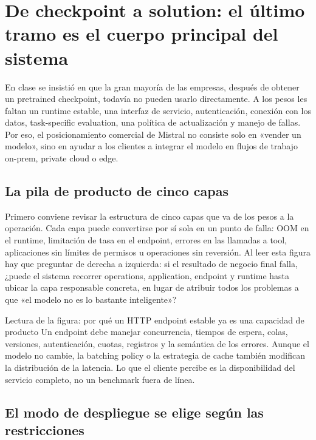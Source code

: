 \section{De checkpoint a solution: el último tramo es el cuerpo principal del sistema}

En clase se insistió en que la gran mayoría de las empresas, después de obtener un pretrained checkpoint, todavía no pueden usarlo directamente. A los pesos les faltan un runtime estable, una interfaz de servicio, autenticación, conexión con los datos, task-specific evaluation, una política de actualización y manejo de fallas. Por eso, el posicionamiento comercial de Mistral no consiste solo en «vender un modelo», sino en ayudar a los clientes a integrar el modelo en flujos de trabajo on-prem, private cloud o edge.

\subsection{La pila de producto de cinco capas}

Primero conviene revisar la estructura de cinco capas que va de los pesos a la operación. Cada capa puede convertirse por sí sola en un punto de falla: OOM en el runtime, limitación de tasa en el endpoint, errores en las llamadas a tool, aplicaciones sin límites de permisos u operaciones sin reversión. Al leer esta figura hay que preguntar de derecha a izquierda: si el resultado de negocio final falla, ¿puede el sistema recorrer operations, application, endpoint y runtime hasta ubicar la capa responsable concreta, en lugar de atribuir todos los problemas a que «el modelo no es lo bastante inteligente»?


\begin{knowledgebox}{Lectura de la figura: por qué un HTTP endpoint estable ya es una capacidad de producto}
Un endpoint debe manejar concurrencia, tiempos de espera, colas, versiones, autenticación, cuotas, registros y la semántica de los errores. Aunque el modelo no cambie, la batching policy o la estrategia de cache también modifican la distribución de la latencia. Lo que el cliente percibe es la disponibilidad del servicio completo, no un benchmark fuera de línea.
\end{knowledgebox}

\subsection{El modo de despliegue se elige según las restricciones}

